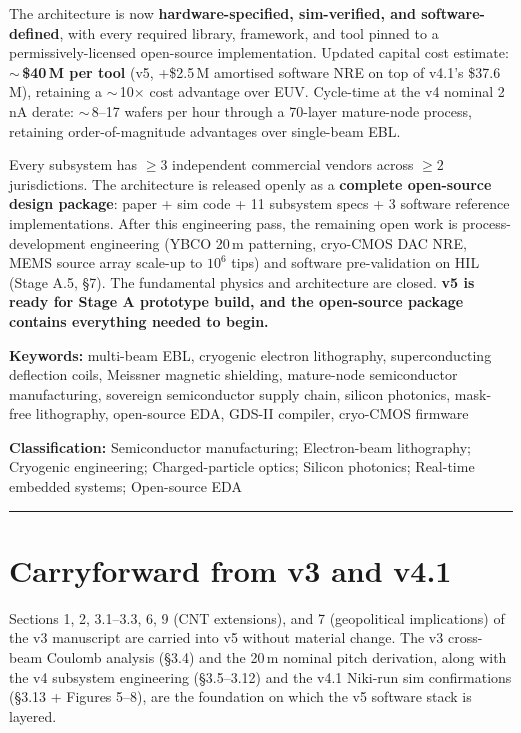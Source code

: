 \documentclass[11pt,letterpaper]{article}
\begin{document}
The architecture is now \textbf{hardware-specified, sim-verified, and software-defined}, with every required library, framework, and tool pinned to a permissively-licensed open-source implementation. Updated capital cost estimate: \textbf{$\sim$\,\$40\,M per tool} (v5, +\$2.5\,M amortised software NRE on top of v4.1's \$37.6\,M), retaining a $\sim$\,10$\times$ cost advantage over EUV. Cycle-time at the v4 nominal 2\,nA derate: $\sim$\,8--17 wafers per hour through a 70-layer mature-node process, retaining order-of-magnitude advantages over single-beam EBL.

Every subsystem has $\geq 3$ independent commercial vendors across $\geq 2$ jurisdictions. The architecture is released openly as a \textbf{complete open-source design package}: paper + sim code + 11 subsystem specs + 3 software reference implementations. After this engineering pass, the remaining open work is process-development engineering (YBCO 20\,\textmu m patterning, cryo-CMOS DAC NRE, MEMS source array scale-up to $10^6$ tips) and software pre-validation on HIL (Stage A.5, \S 7). The fundamental physics and architecture are closed. \textbf{v5 is ready for Stage A prototype build, and the open-source package contains everything needed to begin.}

\medskip
\noindent\textbf{Keywords:} multi-beam EBL, cryogenic electron lithography, superconducting deflection coils, Meissner magnetic shielding, mature-node semiconductor manufacturing, sovereign semiconductor supply chain, silicon photonics, mask-free lithography, open-source EDA, GDS-II compiler, cryo-CMOS firmware

\medskip
\noindent\textbf{Classification:} Semiconductor manufacturing; Electron-beam lithography; Cryogenic engineering; Charged-particle optics; Silicon photonics; Real-time embedded systems; Open-source EDA

\bigskip\hrule\bigskip

\section{Carryforward from v3 and v4.1}

Sections 1, 2, 3.1--3.3, 6, 9 (CNT extensions), and 7 (geopolitical implications) of the v3 manuscript are carried into v5 without material change. The v3 cross-beam Coulomb analysis (\S 3.4) and the 20\,\textmu m nominal pitch derivation, along with the v4 subsystem engineering (\S 3.5--3.12) and the v4.1 Niki-run sim confirmations (\S 3.13 + Figures 5--8), are the foundation on which the v5 software stack is layered.
\end{document}
